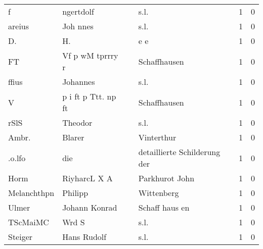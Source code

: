 \begin{tabular}{llllrr}
                        f &                          ngertdolf &             &                                        s.l. &          1 &         0 \\
                   areius &                           Joh nnes &             &                                        s.l. &          1 &         0 \\
                       D. &                                 H. &             &                                         e e &          1 &         0 \\
                       FT &                   Vf p wM tprrry r &             &                                Schaffhausen &          1 &         0 \\
                    ffius &                           Johannes &             &                                        s.l. &          1 &         0 \\
                        V &                p i ft p Ttt. np ft &             &                                Schaffhausen &          1 &         0 \\
                     rSlS &                            Theodor &             &                                        s.l. &          1 &         0 \\
                    Ambr. &                             Blarer &             &                                  Vinterthur &          1 &         0 \\
                   .o.lfo &                                die &             &                detaillierte Schilderung der &          1 &         0 \\
                     Horm &                       RiyharcL X A &             &                              Parkhurot John &          1 &         0 \\
              Melanchthpn &                            Philipp &             &                                  Wittenberg &          1 &         0 \\
                    Ulmer &                      Johann Konrad &             &                              Schaff haus en &          1 &         0 \\
                 TScMaiMC &                              Wrd S &             &                                        s.l. &          1 &         0 \\
                  Steiger &                        Hans Rudolf &             &                                        s.l. &          1 &         0 \\

\end{tabular}
